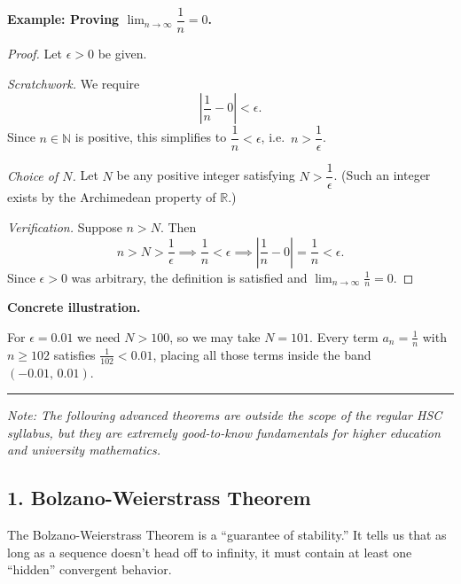 \bigskip
\noindent\textbf{Example: Proving $\displaystyle\lim_{n \to \infty} \dfrac{1}{n} = 0$.}

\begin{proof}
Let $\epsilon > 0$ be given.

\medskip
\noindent\textit{Scratchwork.} We require
\[
  \left|\frac{1}{n} - 0\right| < \epsilon.
\]
Since $n \in \mathbb{N}$ is positive, this simplifies to $\dfrac{1}{n} < \epsilon$, i.e.\ $n > \dfrac{1}{\epsilon}$.

\medskip
\noindent\textit{Choice of $N$.} Let $N$ be any positive integer satisfying $N > \dfrac{1}{\epsilon}$.
(Such an integer exists by the Archimedean property of $\mathbb{R}$.)

\medskip
\noindent\textit{Verification.} Suppose $n > N$. Then
\[
  n > N > \frac{1}{\epsilon}
  \implies \frac{1}{n} < \epsilon
  \implies \left|\frac{1}{n} - 0\right| = \frac{1}{n} < \epsilon.
\]
Since $\epsilon > 0$ was arbitrary, the definition is satisfied and
$\displaystyle\lim_{n \to \infty} \frac{1}{n} = 0$.
\end{proof}

\medskip
\noindent\textbf{Concrete illustration.}

For $\epsilon = 0.01$ we need $N > 100$, so we may take $N = 101$.
Every term $a_n = \tfrac{1}{n}$ with $n \ge 102$ satisfies
$\tfrac{1}{102} < 0.01$, placing all those terms inside the band $(-0.01,\, 0.01)$.

\vspace{1em}
\hrule
\vspace{1em}

\noindent\textit{Note: The following advanced theorems are outside the scope of the regular HSC syllabus, but they are extremely good-to-know fundamentals for higher education and university mathematics.}

\subsection*{1. Bolzano-Weierstrass Theorem}

The Bolzano-Weierstrass Theorem is a ``guarantee of stability.'' It tells us that as long as a sequence doesn't head off to infinity, it must contain at least one ``hidden'' convergent behavior.

